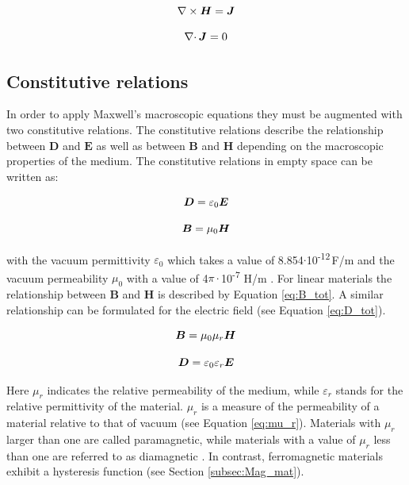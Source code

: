 \begin{equation}
\label{eq:Ampere_stat}
\centering
\nabla\times\boldsymbol{H} = \boldsymbol{J} 
\end{equation}

\begin{equation}
\label{eq:Konti_Mag_stat}
\centering
\nabla\cdotp\boldsymbol{J} = 0
\end{equation}

\subsection{Constitutive relations}
\label{subsec:const_rel}

In order to apply Maxwell's macroscopic equations they must be augmented with two constitutive relations. The constitutive relations describe the relationship between $\boldsymbol{D}$ and $\boldsymbol{E}$ as well as between $\boldsymbol{B}$ and $\boldsymbol{H}$ depending on the macroscopic properties of the medium. The constitutive relations in empty space can be written as: 

\begin{equation}
\label{eq:disp_const_rel}
\centering
\boldsymbol{D} = \varepsilon_{0}\boldsymbol{E} 
\end{equation}

\begin{equation}
\label{eq:B_vac}
\centering
\boldsymbol{B} = \mu_{0}\boldsymbol{H}
\end{equation}

with the vacuum permittivity $\varepsilon_{0}$ which takes a value of 8.854$\cdotp$10\textsuperscript{-12}\,F/m and the vacuum permeability $\mu_{0}$ with a value of 4$\pi\cdotp$10\textsuperscript{-7} H/m \cite{monk2003finite,kallenbach2018elektromagnete}. For linear materials the relationship between $\boldsymbol{B}$ and $\boldsymbol{H}$ is described by Equation \ref{eq:B_tot}. A similar relationship can be formulated for the electric field (see Equation \ref{eq:D_tot}).    

\begin{equation}
\label{eq:B_tot}
\centering
\boldsymbol{B} = \mu_{0}\mu_{r}\boldsymbol{H}
\end{equation}

\begin{equation}
\label{eq:D_tot}
\centering
\boldsymbol{D} = \varepsilon_{0}\varepsilon_{r}\boldsymbol{E}
\end{equation}

Here $\mu_{r}$ indicates the relative permeability of the medium, while $\varepsilon_{r}$ stands for the relative permittivity of the material. $\mu_{r}$ is a measure of the permeability of a material relative to that of vacuum (see Equation \ref{eq:mu_r}). Materials with $\mu_{r}$ larger than one are called paramagnetic, while materials with a value of $\mu_{r}$ less than one are referred to as diamagnetic \cite{svoboda2004magnetic}. In contrast, ferromagnetic materials exhibit a hysteresis function (see Section \ref{subsec:Mag_mat}).  

